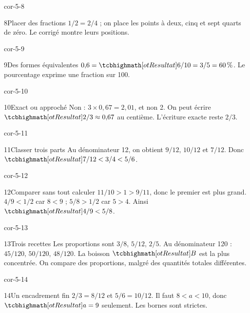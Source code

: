 \begin{blocLivre}{cor-5-8}\begin{corrige}{8}{Placer des fractions}
$1/2=2/4$ ; on place les points à deux, cinq et sept quarts de zéro. Le corrigé montre leurs positions.
\label{fig-cor-5-8}
\end{corrige}\end{blocLivre}
\begin{blocLivre}{cor-5-9}\begin{corrige}{9}{Des formes équivalentes}
$0{,}6=\res{6/10=3/5=60\,\%}$. Le pourcentage exprime une fraction sur 100.
\end{corrige}\end{blocLivre}
\begin{blocLivre}{cor-5-10}\begin{corrige}{10}{Exact ou approché}
Non : $3\times0{,}67=2{,}01$, et non 2. On peut écrire $\res{2/3\approx0{,}67}$ au centième. L’écriture exacte reste $2/3$.
\end{corrige}\end{blocLivre}
\begin{blocLivre}{cor-5-11}\begin{corrige}{11}{Classer trois parts}
Au dénominateur 12, on obtient $9/12$, $10/12$ et $7/12$. Donc $\res{7/12<3/4<5/6}$.
\end{corrige}\end{blocLivre}
\begin{blocLivre}{cor-5-12}\begin{corrige}{12}{Comparer sans tout calculer}
$11/10>1>9/11$, donc le premier est plus grand. $4/9<1/2$ car $8<9$ ; $5/8>1/2$ car $5>4$. Ainsi $\res{4/9<5/8}$.
\end{corrige}\end{blocLivre}
\begin{blocLivre}{cor-5-13}\begin{corrige}{13}{Trois recettes}
Les proportions sont $3/8$, $5/12$, $2/5$. Au dénominateur 120 : $45/120$, $50/120$, $48/120$. La boisson $\res B$ est la plus concentrée. On compare des proportions, malgré des quantités totales différentes.
\end{corrige}\end{blocLivre}
\begin{blocLivre}{cor-5-14}\begin{corrige}{14}{Un encadrement fin}
$2/3=8/12$ et $5/6=10/12$. Il faut $8<a<10$, donc $\res{a=9}$ seulement. Les bornes sont strictes.
\end{corrige}\end{blocLivre}
